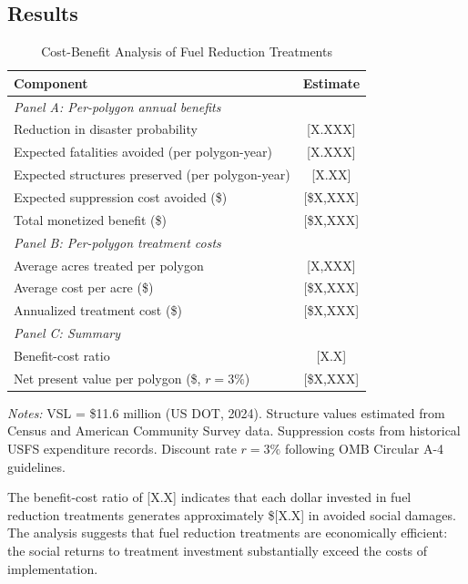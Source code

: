 \documentclass[12pt, letterpaper]{article}
\begin{document}
\subsection{Results}

\begin{table}[H]
\centering
\small
\begin{threeparttable}
\caption{Cost-Benefit Analysis of Fuel Reduction Treatments}
\label{tab:cba}
\begin{tabular}{lc}
\toprule
Component & Estimate \\
\midrule
\multicolumn{2}{l}{\textit{Panel A: Per-polygon annual benefits}} \\
Reduction in disaster probability & [X.XXX] \\
Expected fatalities avoided (per polygon-year) & [X.XXX] \\
Expected structures preserved (per polygon-year) & [X.XX] \\
Expected suppression cost avoided (\$) & [\$X,XXX] \\
Total monetized benefit (\$) & [\$X,XXX] \\
[0.5em]
\multicolumn{2}{l}{\textit{Panel B: Per-polygon treatment costs}} \\
Average acres treated per polygon & [X,XXX] \\
Average cost per acre (\$) & [\$X,XXX] \\
Annualized treatment cost (\$) & [\$X,XXX] \\
[0.5em]
\multicolumn{2}{l}{\textit{Panel C: Summary}} \\
Benefit-cost ratio & [X.X] \\
Net present value per polygon (\$, $r=3\%$) & [\$X,XXX] \\
\bottomrule
\end{tabular}
\begin{tablenotes}
\small
\item \textit{Notes:} VSL = \$11.6 million (US DOT, 2024). Structure values estimated from Census and American Community Survey data. Suppression costs from historical USFS expenditure records. Discount rate $r = 3\%$ following OMB Circular A-4 guidelines.
\end{tablenotes}
\end{threeparttable}
\end{table}

The benefit-cost ratio of [X.X] indicates that each dollar invested in fuel reduction treatments generates approximately \$[X.X] in avoided social damages. The analysis suggests that fuel reduction treatments are economically efficient: the social returns to treatment investment substantially exceed the costs of implementation.
\end{document}
